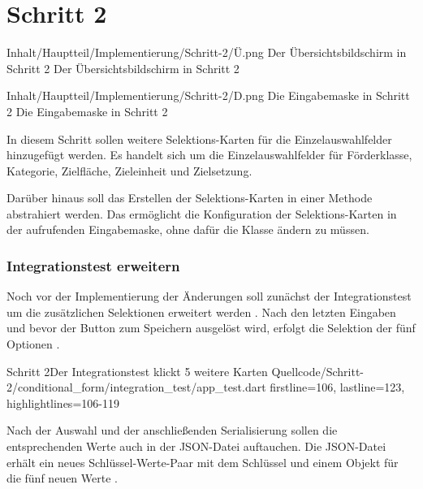 \chapter{Schritt 2}
\label{chap:Schritt-2}

\begin{alexfigure}{Inhalt/Hauptteil/Implementierung/Schritt-2/Ü.png}
  {Der Übersichtsbildschirm in Schritt 2}
  {Der Übersichtsbildschirm in Schritt 2}

  \label{fig:Schritt2Uebersicht}

\end{alexfigure}

\begin{alexfigure}{Inhalt/Hauptteil/Implementierung/Schritt-2/D.png}
  {Die Eingabemaske in Schritt 2}
  {Die Eingabemaske in Schritt 2}

  \label{fig:Schritt2Eingabemaske}

\end{alexfigure}

In diesem Schritt sollen weitere Selektions-Karten für die Einzelauswahlfelder hinzugefügt werden.
Es handelt sich um die Einzelauswahlfelder für Förderklasse, Kategorie, Zielfläche, Zieleinheit und Zielsetzung. 

Darüber hinaus soll das Erstellen der Selektions-Karten in einer Methode abstrahiert werden.
Das ermöglicht die Konfiguration der Selektions-Karten in der aufrufenden Eingabemaske, ohne dafür die Klasse  ändern zu müssen.

\subsection{Integrationstest erweitern}

Noch vor der Implementierung der Änderungen soll zunächst der Integrationstest um die zusätzlichen Selektionen erweitert werden \Lst{\ref{lst:Schritt2IntegrationstestKlickt5WeitereKarten}}. Nach den letzten Eingaben und bevor der Button zum Speichern ausgelöst wird, erfolgt die Selektion der fünf Optionen .   

\begin{alexlisting}{Schritt 2}{Der Integrationstest klickt 5 weitere Karten}
  {Quellcode/Schritt-2/conditional_form/integration_test/app_test.dart}
  {firstline=106, lastline=123, highlightlines={106-119}}
  \label{lst:Schritt2IntegrationstestKlickt5WeitereKarten}
\end{alexlisting}

Nach der Auswahl und der anschließenden Serialisierung sollen die entsprechenden Werte auch in der JSON-Datei auftauchen.
Die JSON-Datei erhält ein neues Schlüssel-Werte-Paar mit dem Schlüssel  und einem Objekt für die fünf neuen Werte .

